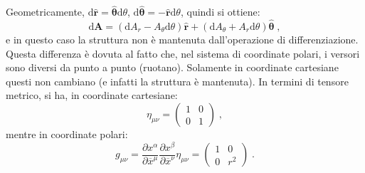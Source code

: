 \documentclass[12pt,a4paper]{report}
\theoremstyle{definition}
\newcommand{\diff}[1][]{\mathrm{d}#1}
\begin{document}
Geometricamente, $\diff{\hat{\mathbf{r}}}=\hat{\boldsymbol{\theta}}\diff{\theta}$, $\diff{\hat{\boldsymbol{\theta}}}=-\hat{\mathbf{r}}\diff{\theta}$, quindi si ottiene:
\begin{equation}
\diff{\mathbf{A}}=(\diff{A_r}-A_{\theta}\diff{\theta})\hat{\mathbf{r}}+(\diff{A_{\theta}}+A_r\diff{\theta})\hat{\boldsymbol{\theta}}\;,
\end{equation}
e in questo caso la struttura non è mantenuta dall'operazione di differenziazione. Questa differenza è dovuta al fatto che, nel sistema di coordinate polari, i versori sono diversi da punto a punto (ruotano). Solamente in coordinate cartesiane questi non cambiano (e infatti la struttura è mantenuta). In termini di tensore metrico, si ha, in coordinate cartesiane:
$$
\eta_{\mu\nu}=\left(\begin{matrix}
1 & 0 \\
0 & 1
\end{matrix}\right)\;,
$$
mentre in coordinate polari:
\begin{equation}
g_{\mu\nu}=\frac{\partial x^{\alpha}}{\partial \overline{x}^{\mu}}\frac{\partial x^{\beta}}{\partial\overline{x}^{\nu}}\eta_{\mu\nu}=\left(\begin{matrix}
1 & 0 \\
0 & r^2
\end{matrix}\right)\;.
\end{equation}
\end{document}
